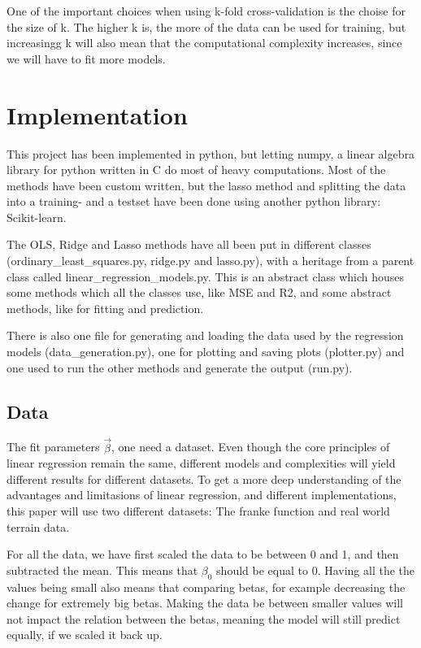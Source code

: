 \documentclass[12pt]{article}
\newcommand{\bbeta}{\vec{\beta}}
\begin{document}
One of the important choices when using k-fold cross-validation is the choise for the size of k.
The higher k is, the more of the data can be used for training, but increasingg k will also mean that the computational complexity increases, since we will have to fit more models.



\section{Implementation}

This project has been implemented in python, but letting numpy, a linear algebra library for python written in C do most of heavy computations.
Most of the methods have been custom written, but the lasso method and splitting the data into a training- and a testset have been done using another python library: Scikit-learn.

The OLS, Ridge and Lasso methods have all been put in different classes (ordinary\_least\_squares.py, ridge.py and lasso.py), with a heritage from a parent class called linear\_regression\_models.py.
This is an abstract class which houses some methods which all the classes use, like MSE and R2, and some abstract methods, like for fitting and prediction.

There is also one file for generating and loading the data used by the regression models (data\_generation.py), one for plotting and saving plots (plotter.py) and one used to run the other methods and generate the output (run.py).



\subsection{Data}


The fit parameters $\bbeta$, one need a dataset.
Even though the core principles of linear regression remain the same, different models and complexities will yield different results for different datasets.
To get a more deep understanding of the advantages and limitasions of linear regression, and different implementations, this paper will use two different datasets: The franke function and real world terrain data.

For all the data, we have first scaled the data to be between 0 and 1, and then subtracted the mean.
This means that $\beta_0$ should be equal to $0$.
Having all the the values being small also means that comparing betas, for example decreasing the change for extremely big betas.
Making the data be between smaller values will not impact the relation between the betas, meaning the model will still predict equally, if we scaled it back up.
\end{document}
